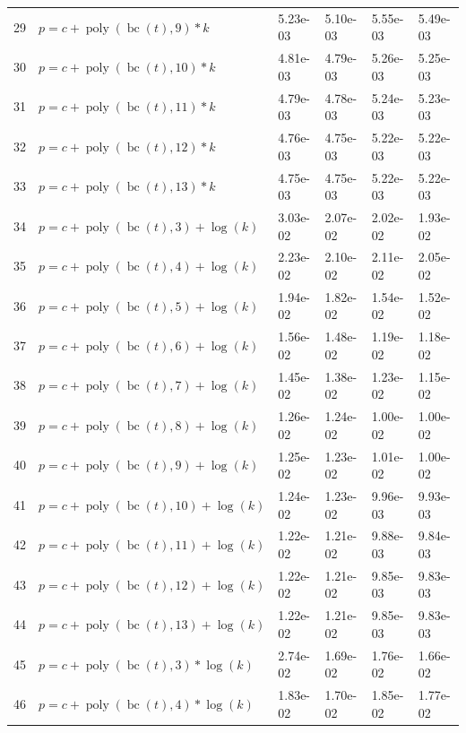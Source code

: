 \documentclass[12pt,a4paper]{article}
\DeclareMathOperator{\bc}{bc}
\DeclareMathOperator{\poly}{poly}
\begin{document}
\begin{longtable}[t]{ll>{\raggedleft\arraybackslash}p{2cm}>{\raggedleft\arraybackslash}p{2cm}>{\raggedleft\arraybackslash}p{2cm}>{\raggedleft\arraybackslash}p{2cm}}
\rowcolor{gray!6}  29 & $p = c + \poly\left( \bc(t), 9 \right) * k$ & 5.23e-03 & 5.10e-03 & 5.55e-03 & 5.49e-03\\
30 & $p = c + \poly\left( \bc(t), 10 \right) * k$ & 4.81e-03 & 4.79e-03 & 5.26e-03 & 5.25e-03\\
\rowcolor{gray!6}  31 & $p = c + \poly\left( \bc(t), 11 \right) * k$ & 4.79e-03 & 4.78e-03 & 5.24e-03 & 5.23e-03\\
32 & $p = c + \poly\left( \bc(t), 12 \right) * k$ & 4.76e-03 & 4.75e-03 & 5.22e-03 & 5.22e-03\\
\rowcolor{gray!6}  33 & $p = c + \poly\left( \bc(t), 13 \right) * k$ & 4.75e-03 & 4.75e-03 & 5.22e-03 & 5.22e-03\\
34 & $p = c + \poly\left( \bc(t), 3 \right) + \log(k)$ & 3.03e-02 & 2.07e-02 & 2.02e-02 & 1.93e-02\\
\rowcolor{gray!6}  35 & $p = c + \poly\left( \bc(t), 4 \right) + \log(k)$ & 2.23e-02 & 2.10e-02 & 2.11e-02 & 2.05e-02\\
36 & $p = c + \poly\left( \bc(t), 5 \right) + \log(k)$ & 1.94e-02 & 1.82e-02 & 1.54e-02 & 1.52e-02\\
\rowcolor{gray!6}  37 & $p = c + \poly\left( \bc(t), 6 \right) + \log(k)$ & 1.56e-02 & 1.48e-02 & 1.19e-02 & 1.18e-02\\
38 & $p = c + \poly\left( \bc(t), 7 \right) + \log(k)$ & 1.45e-02 & 1.38e-02 & 1.23e-02 & 1.15e-02\\
\rowcolor{gray!6}  39 & $p = c + \poly\left( \bc(t), 8 \right) + \log(k)$ & 1.26e-02 & 1.24e-02 & 1.00e-02 & 1.00e-02\\
40 & $p = c + \poly\left( \bc(t), 9 \right) + \log(k)$ & 1.25e-02 & 1.23e-02 & 1.01e-02 & 1.00e-02\\
\rowcolor{gray!6}  41 & $p = c + \poly\left( \bc(t), 10 \right) + \log(k)$ & 1.24e-02 & 1.23e-02 & 9.96e-03 & 9.93e-03\\
42 & $p = c + \poly\left( \bc(t), 11 \right) + \log(k)$ & 1.22e-02 & 1.21e-02 & 9.88e-03 & 9.84e-03\\
\rowcolor{gray!6}  43 & $p = c + \poly\left( \bc(t), 12 \right) + \log(k)$ & 1.22e-02 & 1.21e-02 & 9.85e-03 & 9.83e-03\\
44 & $p = c + \poly\left( \bc(t), 13 \right) + \log(k)$ & 1.22e-02 & 1.21e-02 & 9.85e-03 & 9.83e-03\\
\rowcolor{gray!6}  45 & $p = c + \poly\left( \bc(t), 3 \right) * \log(k)$ & 2.74e-02 & 1.69e-02 & 1.76e-02 & 1.66e-02\\
46 & $p = c + \poly\left( \bc(t), 4 \right) * \log(k)$ & 1.83e-02 & 1.70e-02 & 1.85e-02 & 1.77e-02\\

\end{longtable}
\end{document}
